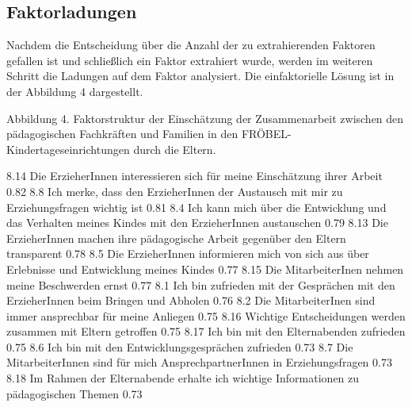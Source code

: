 \documentclass[12pt,a4paper]{article}
\begin{document}
\subsection{Faktorladungen}
Nachdem die Entscheidung über die Anzahl der zu extrahierenden Faktoren gefallen ist und schließlich ein Faktor extrahiert wurde, werden im weiteren Schritt die Ladungen auf dem Faktor analysiert. Die einfaktorielle Lösung ist in der Abbildung 4 dargestellt.

Abbildung 4. Faktorstruktur der Einschätzung der Zusammenarbeit zwischen den pädagogischen Fachkräften und Familien in den FRÖBEL-Kindertageseinrichtungen durch die Eltern.

8.14 Die ErzieherInnen interessieren sich für meine Einschätzung
        ihrer Arbeit                                                                                            0.82
8.8 Ich merke, dass den ErzieherInnen der Austausch mit mir zu
      Erziehungsfragen wichtig ist                                                                   0.81   
8.4 Ich kann mich über die Entwicklung und das Verhalten
      meines Kindes mit den ErzieherInnen austauschen                                0.79
8.13 Die ErzieherInnen machen ihre pädagogische Arbeit gegenüber
        den Eltern transparent                                                                            0.78
8.5 Die ErzieherInnen informieren mich von sich aus über Erlebnisse
      und Entwicklung meines Kindes                                                             0.77
8.15 Die MitarbeiterInen nehmen meine Beschwerden ernst                        0.77
8.1 Ich bin zufrieden mit der Gesprächen mit den ErzieherInnen
      beim Bringen und Abholen	                                                               0.76
8.2 Die MitarbeiterInen sind immer ansprechbar für meine Anliegen           0.75
8.16 Wichtige Entscheidungen werden zusammen mit Eltern
        getroffen                                                                                                  0.75
8.17 Ich bin mit den Elternabenden zufrieden                                                0.75
8.6 Ich bin mit den Entwicklungsgesprächen zufrieden                                 0.73  
8.7 Die MitarbeiterInnen sind für mich AnsprechpartnerInnen in             
      Erziehungsfragen                                                                                       0.73
8.18 Im Rahmen der Elternabende erhalte ich wichtige Informationen
        zu pädagogischen Themen                                                                      0.73
\end{document}
